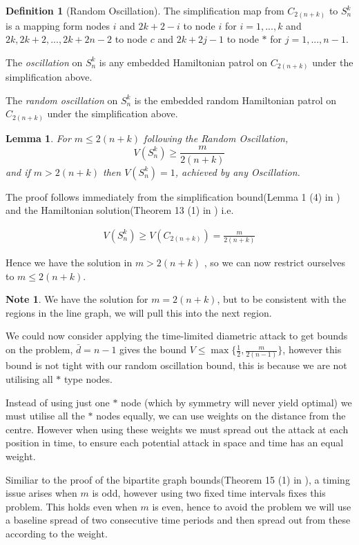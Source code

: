 \documentclass[a4paper,10pt]{article}
\newtheorem{lemma}[theorem]{Lemma}
\theoremstyle{definition}
\newtheorem{definition}[theorem]{Definition}
\theoremstyle{definition}
\theoremstyle{remark}
\theoremstyle{definition}
\newtheorem*{note}{Note}
\begin{document}
\begin{definition}[Random Oscillation]
The simplification map from $C_{2(n+k)}$ to $S_{n}^{k}$ is a mapping form nodes $i$ and $2k+2-i$ to node $i$ for $i=1,...,k$ and $2k,2k+2,...,2k+2n-2$ to node $c$ and $2k+2j-1$ to node $*$ for $j=1,...,n-1$.

The \textit{oscillation} on $S_{n}^{k}$ is any embedded Hamiltonian patrol on $C_{2(n+k)}$ under the simplification above.

The \textit{random oscillation} on $S_{n}^{k}$ is the embedded random Hamiltonian patrol on $C_{2(n+k)}$ under the simplification above.
\end{definition}

\begin{lemma}
For $m \leq 2(n+k)$ following the Random Oscillation,
$$V(S_{n}^{k}) \geq \frac{m}{2(n+k)}$$
and if $m > 2(n+k)$ then $V(S_{n}^{k})=1$, achieved by any Oscillation.
\end{lemma}

The proof follows immediately from the simplification bound(Lemma 1 (4) in \cite{Alpern2011}) and the Hamiltonian solution(Theorem 13 (1) in \cite{Alpern2011}) i.e.

\begin{align*}
V(S_{n}^{k}) \geq V(C_{2(n+k)})=\frac{m}{2(n+k)}
\end{align*}

Hence we have the solution in $m > 2(n+k)$ , so we can now restrict ourselves to $m \leq 2(n+k)$.


\begin{note}
We have the solution for $m=2(n+k)$, but to be consistent with the regions in the line graph, we will pull this into the next region.
\end{note}

We could now consider applying the time-limited diametric attack to get bounds on the problem, $\bar{d}=n-1$ gives the bound $V \leq \max \{\frac{1}{2} , \frac{m}{2(n-1)}  \}$, however this bound is not tight with our random oscillation bound, this is because we are not utilising all $*$ type nodes.

Instead of using just one $*$ node (which by symmetry will never yield optimal) we must utilise all the $*$ nodes equally, we can use weights on the distance from the centre. However when using these weights we must spread out  the attack at each position in time, to ensure each potential attack in space and time has an equal weight.

Similiar to the proof of the bipartite graph bounds(Theorem 15 (1) in \cite{Alpern2011}), a timing issue arises when $m$ is odd, however using two fixed time intervals fixes this problem. This holds even when $m$ is even, hence to avoid the problem we will use a baseline spread of two consecutive time periods and then spread out from these according to the weight.
\end{document}
